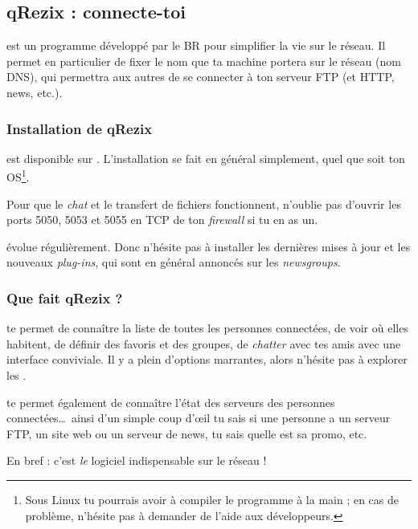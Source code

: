 
\subsection{qRezix : connecte-toi}
\label{qrezix}

 est un programme développé par le BR pour simplifier la vie sur le réseau.
Il permet en particulier de fixer le nom que ta machine portera sur le réseau (nom DNS),
qui permettra aux autres de se connecter à ton serveur FTP (et HTTP, news, etc.).


\subsubsection{Installation de qRezix}

 est disponible sur \xshare. L'installation se fait en général simplement, quel que soit ton
OS\footnote{Sous Linux tu pourrais avoir à compiler le programme à la main ;
en cas de problème, n'hésite pas à demander de l'aide aux développeurs.}.

Pour que le \emph{chat} et le transfert de fichiers fonctionnent, n'oublie pas d'ouvrir les ports 5050, 5053 et 5055 en TCP de ton \emph{firewall} si
tu en as un.

 évolue régulièrement. Donc n'hésite pas à installer les dernières mises à jour et les nouveaux \emph{plug-ins}, qui sont en général
annoncés sur les \emph{newsgroups}.

\subsubsection{Que fait qRezix ?}

 te permet de connaître la liste de toutes les personnes connectées, de voir où elles habitent, de définir des favoris et des groupes, de
\emph{chatter} avec tes amis avec une interface conviviale. Il y a plein d'options marrantes, alors n'hésite pas à explorer les .

 te permet également de connaître l'état des serveurs des personnes connectées\ldots\
ainsi d'un simple coup d'\oe il tu sais si une personne a un serveur FTP,
un site web ou un serveur de news, tu sais quelle est sa promo, etc.

En bref :  c'est \emph{le} logiciel indispensable sur le réseau !

